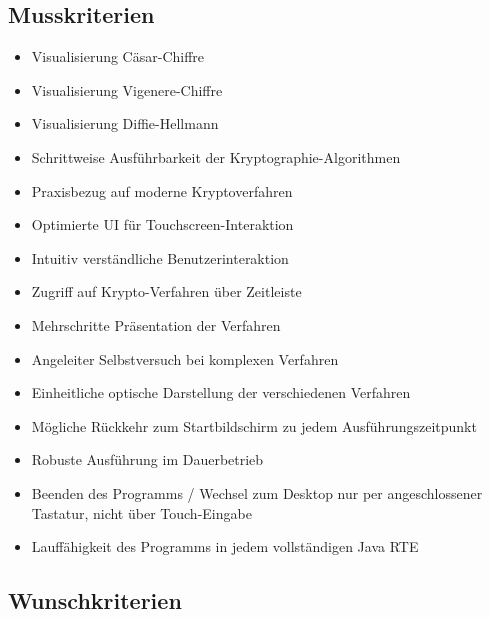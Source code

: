 \documentclass{article}
\begin{document}
\subsection{Musskriterien}

\begin{itemize}
    \item Visualisierung Cäsar-Chiffre
    \item Visualisierung Vigenere-Chiffre
    \item Visualisierung Diffie-Hellmann
    \item Schrittweise Ausführbarkeit der Kryptographie-Algorithmen
    \item Praxisbezug auf moderne Kryptoverfahren
    \item Optimierte \gls{UI} für Touchscreen-Interaktion
    \item Intuitiv verständliche Benutzerinteraktion
    \item Zugriff auf Krypto-Verfahren über Zeitleiste
    \item Mehrschritte Präsentation der Verfahren
    \item Angeleiter Selbstversuch bei komplexen Verfahren
    \item Einheitliche optische Darstellung der verschiedenen Verfahren
    \item Mögliche Rückkehr zum Startbildschirm zu jedem Ausführungszeitpunkt
    \item Robuste Ausführung im Dauerbetrieb
    \item Beenden des Programms / Wechsel zum Desktop nur per angeschlossener Tastatur, nicht über Touch-Eingabe
    \item Lauffähigkeit des Programms in jedem vollständigen Java RTE
\end{itemize}

\subsection{Wunschkriterien}
\end{document}
